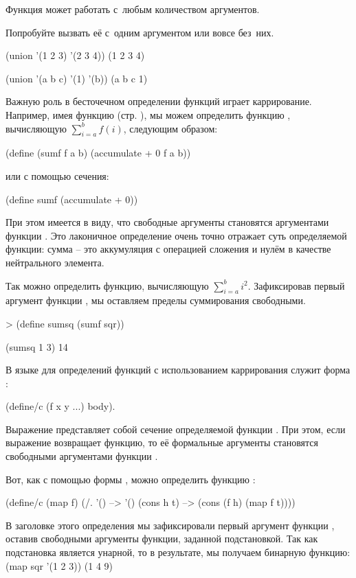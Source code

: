 \begin{example}{Функция  может работать с~любым количеством аргументов.

Попробуйте вызвать её с~одним аргументом или вовсе без~них.}
\REPL
  {(union '(1 2 3) '(2 3 4))}
  {(1 2 3 4)}

\REPL
  {(union '(a b c) '(1) '(b))}
  {(a b c 1)} 
\end{example}

Важную роль в бесточечном определении функций играет каррирование. Например, имея функцию  (стр. \pageref{accumulate}), мы можем определить функцию , вычисляющую $\sum_{i=a}^b f(i)$,  следующим образом:
\begin{SchemeCode}[emph={f,a,b}]
  (define (sumf f a b) (accumulate + 0 f a b))
\end{SchemeCode}
или с помощью сечения:
\begin{SchemeCode}
  (define sumf (accumulate + 0))
\end{SchemeCode}
При этом имеется в виду, что свободные аргументы  становятся аргументами функции . Это лаконичное определение очень точно отражает суть определяемой функции: сумма -- это аккумуляция с операцией сложения и нулём в качестве нейтрального элемента.

Так можно определить функцию, вычисляющую $\sum_{i=a}^b i^2$. Зафиксировав первый аргумент функции , мы оставляем пределы суммирования свободными.
\begin{SchemeCode}
   > (define sumsq (sumf sqr))
\end{SchemeCode}
\REPL
  {(sumsq 1 3)}
  {14} 

В языке \Scheme для определений функций с использованием каррирования служит форма :\label{define-c} 
\begin{SchemeCode}
(define/c (f x y ...) body).
\end{SchemeCode}
Выражение  представляет собой сечение определяемой функции . При этом, если выражение  возвращает функцию, то её формальные аргументы становятся свободными аргументами функции .

Вот, как с помощью формы , можно определить функцию :
\begin{SchemeCode}[emph={f,h,t}]
(define/c (map f)
  (/. '() --> '()
      (cons h t) --> (cons (f h) (map f t))))
\end{SchemeCode}
В заголовке этого определения мы зафиксировали первый аргумент функции , оставив свободными аргументы функции, заданной подстановкой. Так как подстановка является унарной, то в результате, мы получаем бинарную функцию:
\REPL
  {(map sqr '(1 2 3))}
  {(1 4 9)} 

